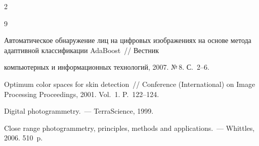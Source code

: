 \begin{multicols}{2}
{{\begin{thebibliography}{9}




Автоматическое обнаружение лиц на цифровых изображениях на основе метода адаптивной классификации AdaBoost~// Вестник 


компьютерных и информационных технологий, 2007. №\,8. С.~2--6.





\label{end\stat}









Optimum color spaces for skin detection~// Conference (International) on Image Processing Proceedings, 2001. Vol.~1. P.~122--124.









Digital photogrammetry.~--- TerraScience, 1999. 









Close range photogrammetry, principles, methods and applications.~--- Whittles, 2006.  510~p. 








 \end{thebibliography}


}


}


\end{multicols}


